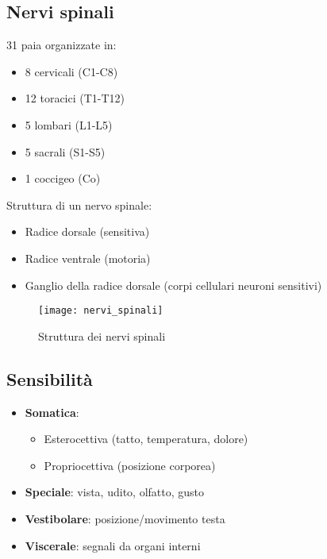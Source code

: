\documentclass[11pt]{article}
\begin{document}
\subsection*{Nervi spinali}
31 paia organizzate in:
\begin{itemize}
    \item 8 cervicali (C1-C8)
    \item 12 toracici (T1-T12)
    \item 5 lombari (L1-L5)
    \item 5 sacrali (S1-S5)
    \item 1 coccigeo (Co)
\end{itemize}
Struttura di un nervo spinale:
\begin{itemize}
    \item Radice dorsale (sensitiva)
    \item Radice ventrale (motoria)
    \item Ganglio della radice dorsale (corpi cellulari neuroni sensitivi)
\end{itemize}
\begin{figure}[h]
    \centering
    \texttt{[image: nervi\_spinali]} %
    \caption{Struttura dei nervi spinali}
    \label{fig:nervi_spinali}
\end{figure}

\subsection*{Sensibilità}
\begin{itemize}
    \item \textbf{Somatica}:
    \begin{itemize}
        \item Esterocettiva (tatto, temperatura, dolore)
        \item Propriocettiva (posizione corporea)
    \end{itemize}
    \item \textbf{Speciale}: vista, udito, olfatto, gusto
    \item \textbf{Vestibolare}: posizione/movimento testa
    \item \textbf{Viscerale}: segnali da organi interni
\end{itemize}
\end{document}
